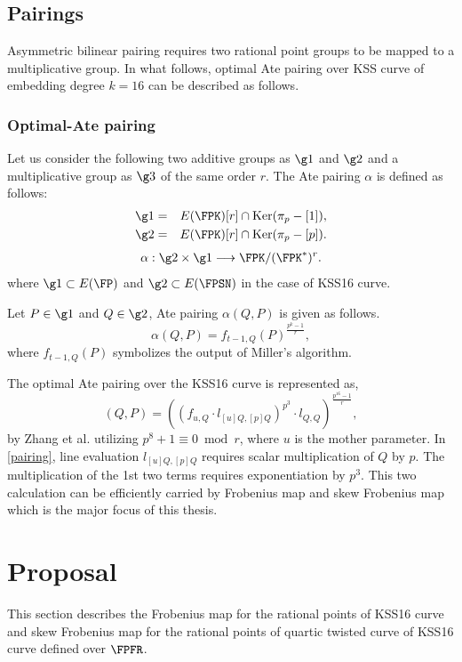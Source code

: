\subsection{Pairings}
 Asymmetric bilinear pairing requires two rational point groups to be mapped to a multiplicative group.
In what follows,  optimal Ate pairing over KSS curve of embedding degree $k = 16$ can be described as follows.
\subsubsection{Optimal-Ate pairing}
Let us consider the following two additive groups as $\g1$ and $\g2$ and a multiplicative group as $\g3$ of the same order $r$. The Ate pairing $\alpha$ is defined as follows:
\begin{eqnarray}
	\g1&=&E(\FPK)[r]\cap {\rm Ker}(\pi_p-[1])\nonumber,\\
	\g2&=&E(\FPK)[r]\cap {\rm Ker}(\pi_p-[p])\nonumber.
\end{eqnarray}
\begin{eqnarray}
	\alpha:\g2\times\g1\longrightarrow\FPK/(\FPK^*)^r.
\end{eqnarray}
where $\g1 \subset E(\FP)$ and $\g2 \subset E(\FPSN)$  in the case of KSS16 curve.

Let $P \in \g1$ and $Q\in\g2$, Ate pairing $\alpha(Q,P)$ is given as follows.
\begin{equation}
	\alpha(Q,P)=f_{t-1,Q}(P)^{\frac{p^k-1}{r}},
\end{equation}
where $f_{t-1,Q}(P)$ symbolizes the output of Miller's algorithm. 

The optimal Ate pairing over the KSS16 curve is represented as,
\begin{equation}
	(Q,P)=((f_{u,Q}\cdot l_{[u]Q,[p]Q})^{p^3}\cdot l_{Q,Q})^{\frac{p^{16}-1}{r}}\label{pairing},
\end{equation}
by  Zhang et al. \cite{INDOCRYPT:ZhaLin12} utilizing $p^8 +1 \equiv 0 \bmod r$, where $u$ is the mother parameter.
In \eqref{pairing}, line evaluation $l_{[u]Q,[p]Q}$ requires scalar multiplication of $Q$ by $p$. The multiplication of the 1st two terms requires exponentiation by $p^3$. This two calculation can be efficiently carried by Frobenius map and skew Frobenius map which is the major focus of this thesis.

\section{Proposal}
This section describes the Frobenius map for the rational points of KSS16 curve and skew Frobenius map for the rational points of quartic twisted curve of KSS16 curve defined over $\FPFR$.

